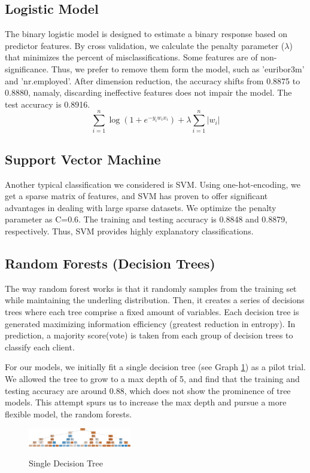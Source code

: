\documentclass[forprint]{mytemplate}
\begin{document}
\begin{multicols}{2}
\subsection{Logistic Model}
The binary logistic model is designed to estimate a binary response based on predictor features. By cross validation, we calculate the penalty parameter ($\lambda$) that minimizes the percent of misclassifications. Some features are of non-significance. Thus, we prefer to remove them form the model, such as 'euribor3m' and 'nr.employed'. After dimension reduction, the accuracy shifts from 0.8875 to 0.8880, namaly, discarding ineffective features does not impair the model. The test accuracy is 0.8916.
\begin{equation}\label{eq02}
  \sum_{i=1}^n\log(1+e^{-y_iw_ix_i})+\lambda\sum_{i=1}^n|w_i|
\end{equation}
\subsection{Support Vector Machine}
Another typical classification we considered is SVM. Using one-hot-encoding, we get a sparse matrix of features, and SVM  has proven to offer significant advantages in dealing with large sparse datasets. We optimize the penalty parameter as C=0.6. The training and testing accuracy is 0.8848 and 0.8879, respectively. Thus, SVM provides highly explanatory classifications.

\subsection{Random Forests (Decision Trees)}
The way random forest works is that it randomly samples from the training set while maintaining the underling distribution. Then, it creates a series of decisions trees where each tree comprise a fixed amount of variables. Each decision tree is generated maximizing information efficiency (greatest reduction in entropy). In prediction, a majority score(vote) is taken from each group of decision trees to classify each client.

For our models, we initially fit a single decision tree (see {\color{red}Graph \ref{g04}}) as a pilot trial. We allowed the tree to grow to a max depth of 5, and find that the training and testing accuracy are around 0.88, which does not show the prominence of tree models. This attempt spurs us to increase the max depth and pursue a more flexible model, the random forests.

\begin{figure}[!htp]
  \centering
  \includegraphics[width=4.5cm]{tree.png}\\
  \caption{Single Decision Tree}\label{g04}
\end{figure}


\end{multicols}
\end{document}

